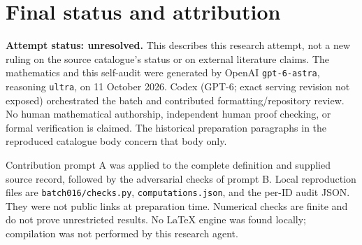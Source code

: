 \documentclass[11pt]{article}
\begin{document}
\section{Final status and attribution}
\textbf{Attempt status: unresolved.} This describes this research attempt, not a new ruling on the source catalogue's status or on external literature claims.
The mathematics and this self-audit were generated by OpenAI \texttt{gpt-6-astra}, reasoning \texttt{ultra}, on 11 October 2026. Codex (GPT-6; exact serving revision not exposed) orchestrated the batch and contributed formatting/repository review. No human mathematical authorship, independent human proof checking, or formal verification is claimed. The historical preparation paragraphs in the reproduced catalogue body concern that body only.

Contribution prompt A was applied to the complete definition and supplied source record, followed by the adversarial checks of prompt B. Local reproduction files are \texttt{batch016/checks.py}, \texttt{computations.json}, and the per-ID audit JSON. They were not public links at preparation time. Numerical checks are finite and do not prove unrestricted results. No LaTeX engine was found locally; compilation was not performed by this research agent.
\end{document}
